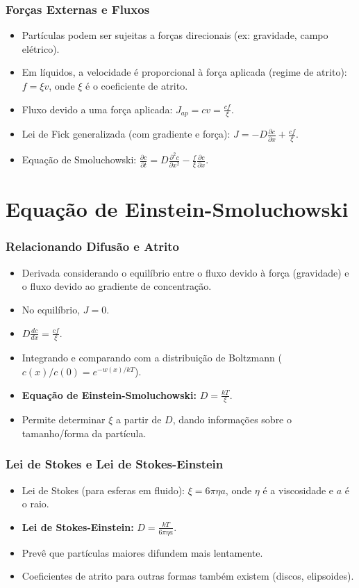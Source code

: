 \documentclass[11pt]{beamer}
\begin{document}
\begin{frame}
    \frametitle{Forças Externas e Fluxos}
    \begin{itemize}
        \item Partículas podem ser sujeitas a forças direcionais (ex: gravidade, campo elétrico).
        \item Em líquidos, a velocidade é proporcional à força aplicada (regime de atrito): $f = \xi v$, onde $\xi$ é o coeficiente de atrito.
        \item Fluxo devido a uma força aplicada: $J_{ap} = c v = \frac{cf}{\xi}$.
        \item Lei de Fick generalizada (com gradiente e força): $J = -D \frac{\partial c}{\partial x} + \frac{cf}{\xi}$.
        \item Equação de Smoluchowski: $\frac{\partial c}{\partial t} = D \frac{\partial^2 c}{\partial x^2} - \frac{f}{\xi} \frac{\partial c}{\partial x}$.
    \end{itemize}
\end{frame}

\section{Equação de Einstein-Smoluchowski}

\begin{frame}
    \frametitle{Relacionando Difusão e Atrito}
    \begin{itemize}
        \item Derivada considerando o equilíbrio entre o fluxo devido à força (gravidade) e o fluxo devido ao gradiente de concentração.
        \item No equilíbrio, $J=0$.
        \item $D \frac{dc}{dx} = \frac{cf}{\xi}$.
        \item Integrando e comparando com a distribuição de Boltzmann ($c(x)/c(0) = e^{-w(x)/kT}$).
        \item \textbf{Equação de Einstein-Smoluchowski:} $D = \frac{kT}{\xi}$.
        \item Permite determinar $\xi$ a partir de $D$, dando informações sobre o tamanho/forma da partícula.
    \end{itemize}
\end{frame}

\begin{frame}
    \frametitle{Lei de Stokes e Lei de Stokes-Einstein}
    \begin{itemize}
        \item Lei de Stokes (para esferas em fluido): $\xi = 6\pi\eta a$, onde $\eta$ é a viscosidade e $a$ é o raio.
        \item \textbf{Lei de Stokes-Einstein:} $D = \frac{kT}{6\pi\eta a}$.
        \item Prevê que partículas maiores difundem mais lentamente.
        \item Coeficientes de atrito para outras formas também existem (discos, elipsoides).
    \end{itemize}
\end{frame}
\end{document}
